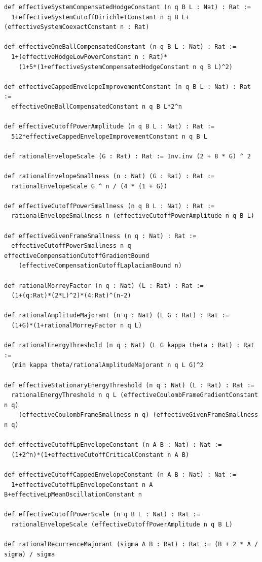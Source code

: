 \documentclass[reqno,11pt]{amsart}
\numberwithin{equation}{section}
\theoremstyle{definition}
\theoremstyle{remark}
\begin{document}
\begin{lstlisting}
def effectiveSystemCompensatedHodgeConstant (n q B L : Nat) : Rat :=
  1+effectiveSystemCutoffDirichletConstant n q B L+(effectiveSystemCoexactConstant n : Rat)

def effectiveOneBallCompensatedConstant (n q B L : Nat) : Rat :=
  1+(effectiveHodgeLowPowerConstant n : Rat)*
    (1+5*(1+effectiveSystemCompensatedHodgeConstant n q B L)^2)

def effectiveCappedEnvelopeImprovementConstant (n q B L : Nat) : Rat :=
  effectiveOneBallCompensatedConstant n q B L*2^n

def effectiveCutoffPowerAmplitude (n q B L : Nat) : Rat :=
  512*effectiveCappedEnvelopeImprovementConstant n q B L

def rationalEnvelopeScale (G : Rat) : Rat := Inv.inv (2 + 8 * G) ^ 2

def rationalEnvelopeSmallness (n : Nat) (G : Rat) : Rat :=
  rationalEnvelopeScale G ^ n / (4 * (1 + G))

def effectiveCutoffPowerSmallness (n q B L : Nat) : Rat :=
  rationalEnvelopeSmallness n (effectiveCutoffPowerAmplitude n q B L)

def effectiveGivenFrameSmallness (n q : Nat) : Rat :=
  effectiveCutoffPowerSmallness n q effectiveCompensationCutoffGradientBound
    (effectiveCompensationCutoffLaplacianBound n)

def rationalMorreyFactor (n q : Nat) (L : Rat) : Rat :=
  (1+(q:Rat)*(2*L)^2)*(4:Rat)^(n-2)

def rationalAmplitudeMajorant (n q : Nat) (L G : Rat) : Rat :=
  (1+G)*(1+rationalMorreyFactor n q L)

def rationalEnergyThreshold (n q : Nat) (L G kappa theta : Rat) : Rat :=
  (min kappa theta/rationalAmplitudeMajorant n q L G)^2

def effectiveStationaryEnergyThreshold (n q : Nat) (L : Rat) : Rat :=
  rationalEnergyThreshold n q L (effectiveCoulombFrameGradientConstant n q)
    (effectiveCoulombFrameSmallness n q) (effectiveGivenFrameSmallness n q)

def effectiveCutoffLpEnvelopeConstant (n A B : Nat) : Nat :=
  (1+2^n)*(1+effectiveCutoffCriticalConstant n A B)

def effectiveCutoffCappedEnvelopeConstant (n A B : Nat) : Nat :=
  1+effectiveCutoffLpEnvelopeConstant n A B+effectiveLpMeanOscillationConstant n

def effectiveCutoffPowerScale (n q B L : Nat) : Rat :=
  rationalEnvelopeScale (effectiveCutoffPowerAmplitude n q B L)

def rationalRecurrenceMajorant (sigma A B : Rat) : Rat := (B + 2 * A / sigma) / sigma


\end{lstlisting}
\end{document}
